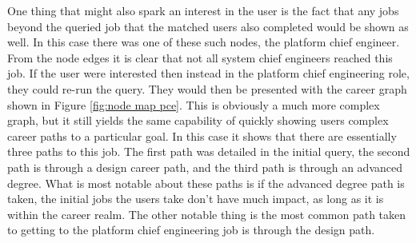 One thing that might also spark an interest in the user is the fact that any
jobs beyond the queried job that the matched users also completed would be shown
as well.  In this case there was one of these such nodes, the platform chief
engineer.  From the node edges it is clear that not all system chief
engineers reached this job.  If the user were interested then instead in the
platform chief engineering role, they could re-run the query.  They would then
be presented with the career graph shown in Figure \ref{fig:node map pce}.  This
is obviously a much more complex graph, but it still yields the same capability
of quickly showing users complex career paths to a particular goal.  In this
case it shows that there are essentially three paths to this job.  The first
path was detailed in the initial query, the second path is through a design
career path, and the third path is through an advanced degree.  What is most
notable about these paths is if the advanced degree path is taken, the initial
jobs the users take don't have much impact, as long as it is within the career realm.
The other notable thing is the most common path taken to getting to the platform
chief engineering job is through the design path.


\usetikzlibrary{shapes,arrows,chains}

